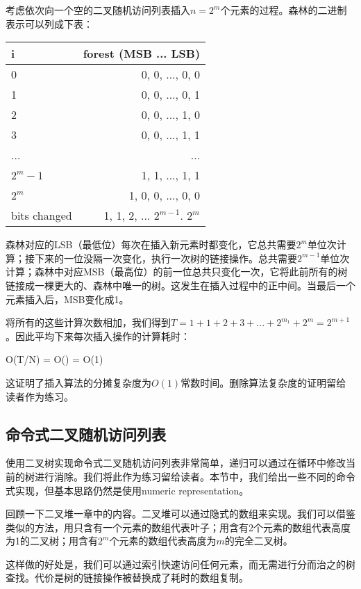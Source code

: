 \documentclass[UTF8]{article}
\begin{document}
考虑依次向一个空的二叉随机访问列表插入$n = 2^m$个元素的过程。森林的二进制表示可以列成下表：

\begin{tabular}{l | r}
  \hline
  i & forest (MSB ... LSB) \\
  \hline
  0 & 0, 0, ..., 0, 0 \\
  1 & 0, 0, ..., 0, 1 \\
  2 & 0, 0, ..., 1, 0 \\
  3 & 0, 0, ..., 1, 1 \\
  ... & ... \\
  $2^m-1$ & 1, 1, ..., 1, 1 \\
  $2^m$ & 1, 0, 0, ..., 0, 0 \\
  \hline
  bits changed & 1, 1, 2, ... $2^{m-1}$. $2^m$ \\
  \hline
\end{tabular}

森林对应的LSB（最低位）每次在插入新元素时都变化，它总共需要$2^m$单位次计算；接下来的一位没隔一次变化，执行一次树的链接操作。总共需要$2^{m-1}$单位次计算；森林中对应MSB（最高位）的前一位总共只变化一次，它将此前所有的树链接成一棵更大的、森林中唯一的树。这发生在插入过程中的正中间。当最后一个元素插入后，MSB变化成1。

将所有的这些计算次数相加，我们得到$T = 1 + 1 + 2 + 3 + ... + 2^{m_1} + 2^m = 2^{m+1}$。因此平均下来每次插入操作的计算耗时：

\be
O(T/N) = O() = O(1)
\ee

这证明了插入算法的分摊复杂度为$O(1)$常数时间。删除算法复杂度的证明留给读者作为练习。

\subsection{命令式二叉随机访问列表}

使用二叉树实现命令式二叉随机访问列表非常简单，递归可以通过在循环中修改当前的树进行消除。我们将此作为练习留给读者。本节中，我们给出一些不同的命令式实现，但基本思路仍然是使用numeric representation。

回顾一下二叉堆一章中的内容。二叉堆可以通过隐式的数组来实现。我们可以借鉴类似的方法，用只含有一个元素的数组代表叶子；用含有2个元素的数组代表高度为1的二叉树；用含有$2^m$个元素的数组代表高度为$m$的完全二叉树。

这样做的好处是，我们可以通过索引快速访问任何元素，而无需进行分而治之的树查找。代价是树的链接操作被替换成了耗时的数组复制。
\end{document}
